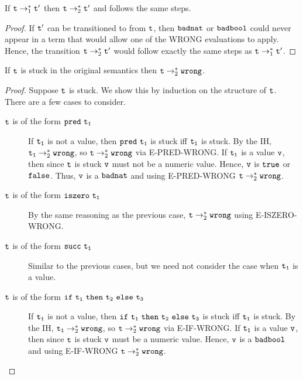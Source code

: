 \begin{lem}\label{lem:samesteps}
    If $\mathtt{t} \rightarrow^*_1 \mathtt{t'}$ then $\mathtt{t} \rightarrow^*_2 \mathtt{t'}$ and follows the same steps.
\end{lem}
\begin{proof} If $\mathtt{t'}$ can be transitioned to from $\mathtt{t}$, then $\mathtt{badnat}$ or $\mathtt{badbool}$
    could never appear in a term that would allow one of the WRONG evaluations to apply.  Hence,
    the transition $\mathtt{t} \rightarrow^*_2 \mathtt{t'}$ would follow exactly the same steps as 
    $\mathtt{t} \rightarrow^*_1 \mathtt{t'}$.
\end{proof}

\begin{lem}
    If $\mathtt{t}$ is stuck in the original semantics then $\mathtt{t} \rightarrow^*_2 \mathtt{wrong}$.
\end{lem}
\begin{proof} Suppose $\mathtt{t}$ is stuck.  We show this by induction on the structure of $\mathtt{t}$.
    There are a few cases to consider.
    \begin{description}
        \item[$\mathtt{t}$ is of the form $\mathtt{pred}\,\,\mathtt{\mathtt{t_1}}$]
            If $\mathtt{t_1}$ is not a value, then $\mathtt{pred}\,\,\mathtt{\mathtt{t_1}}$ is stuck iff $\mathtt{t_1}$ is stuck.
            By the IH, $\mathtt{t_1} \rightarrow^*_2 \mathtt{wrong}$, so $\mathtt{t} \rightarrow^*_2 \mathtt{wrong}$ via E-PRED-WRONG.
            If $\mathtt{t_1}$ is a value $\mathtt{v}$, then
            since $\mathtt{t}$ is stuck $\mathtt{v}$ must not be a numeric value.  Hence, $\mathtt{v}$ is 
            $\mathtt{true}$ or $\mathtt{false}$.  Thus, $\mathtt{v}$ is a $\mathtt{badnat}$ and using E-PRED-WRONG
            $\mathtt{t} \rightarrow^*_2 \mathtt{wrong}$.
        \item[$\mathtt{t}$ is of the form $\mathtt{iszero}\,\,\mathtt{\mathtt{t_1}}$]
            By the same reasoning as the previous case, 
            $\mathtt{t} \rightarrow^*_2 \mathtt{wrong}$ using E-ISZERO-WRONG.
        \item[$\mathtt{t}$ is of the form $\mathtt{succ}\,\,\mathtt{\mathtt{t_1}}$]
            Similar to the previous cases, but we need not consider the case when $\mathtt{t_1}$ is a value.
        \item[$\mathtt{t}$ is of the form $\mathtt{if}\,\,\mathtt{\mathtt{t_1}}\,\,\mathtt{then}\,\,\mathtt{\mathtt{t_2}}\,\,\mathtt{else}\,\,\mathtt{\mathtt{t_3}}$]
            If $\mathtt{t_1}$ is not a value, then $\mathtt{if}\,\,\mathtt{\mathtt{t_1}}\,\,\mathtt{then}\,\,\mathtt{\mathtt{t_2}}\,\,\mathtt{else}\,\,\mathtt{\mathtt{t_3}}$
            is stuck iff $\mathtt{t_1}$ is stuck.  
            By the IH, $\mathtt{t_1} \rightarrow^*_2 \mathtt{wrong}$, so $\mathtt{t} \rightarrow^*_2 \mathtt{wrong}$ via E-IF-WRONG.
            If $\mathtt{t_1}$ is a value $\mathtt{v}$, then 
            since $\mathtt{t}$ is stuck $\mathtt{v}$ must be a numeric value.  Hence, $\mathtt{v}$ is 
            a $\mathtt{badbool}$ and using E-IF-WRONG $\mathtt{t} \rightarrow^*_2 \mathtt{wrong}$.
    \end{description}
\end{proof}

